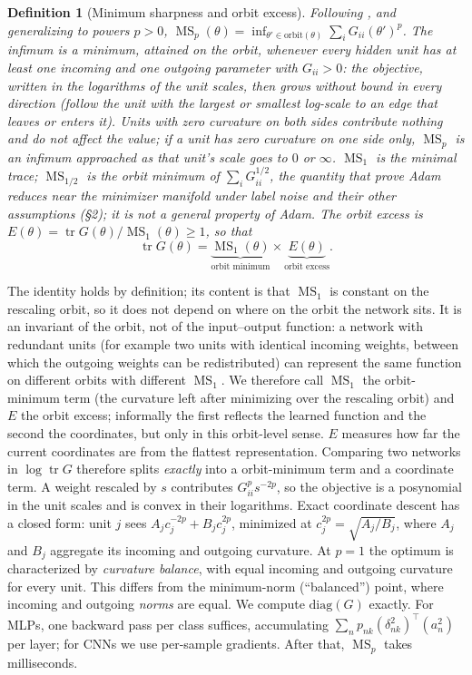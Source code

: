 \documentclass[10pt]{article}
\newtheorem{definition}{Definition}
\theoremstyle{remark}
\newcommand{\tr}{\operatorname{tr}}
\newcommand{\MS}{\operatorname{MS}}
\begin{document}
\begin{definition}[Minimum sharpness and orbit excess]
Following \citet{ibayashi2021minimum}, and generalizing to powers $p>0$,
$\MS_p(\theta)=\inf_{\theta'\in\mathrm{orbit}(\theta)}\sum_iG_{ii}(\theta')^{p}$.
The infimum is a minimum, attained on the orbit, whenever every hidden unit has at least one incoming and one outgoing parameter with $G_{ii}>0$: the objective, written in the logarithms of the unit scales, then grows without bound in every direction (follow the unit with the largest or smallest log-scale to an edge that leaves or enters it). Units with zero curvature on both sides contribute nothing and do not affect the value; if a unit has zero curvature on one side only, $\MS_p$ is an infimum approached as that unit's scale goes to $0$ or $\infty$. $\MS_1$ is the minimal trace; $\MS_{1/2}$ is the orbit minimum of $\sum_i G_{ii}^{1/2}$, the quantity that \citet{li2025adam} prove Adam reduces near the minimizer manifold under label noise and their other assumptions (\S2); it is not a general property of Adam. The \emph{orbit excess} is $E(\theta)=\tr G(\theta)/\MS_1(\theta)\ge1$, so that
\begin{equation}\label{eq:factor}
\tr G(\theta)=\underbrace{\MS_1(\theta)}_{\text{orbit minimum}}\times\underbrace{E(\theta)}_{\text{orbit excess}}.
\end{equation}
\end{definition}

The identity holds by definition; its content is that $\MS_1$ is constant on the rescaling orbit, so it does not depend on where on the orbit the network sits. It is an invariant of the orbit, not of the input--output function: a network with redundant units (for example two units with identical incoming weights, between which the outgoing weights can be redistributed) can represent the same function on different orbits with different $\MS_1$. We therefore call $\MS_1$ the orbit-minimum term (the curvature left after minimizing over the rescaling orbit) and $E$ the orbit excess; informally the first reflects the learned function and the second the coordinates, but only in this orbit-level sense. $E$ measures how far the current coordinates are from the flattest representation. Comparing two networks in $\log\tr G$ therefore splits \emph{exactly} into a orbit-minimum term and a coordinate term. A weight rescaled by $s$ contributes $G_{ii}^p s^{-2p}$, so the objective is a posynomial in the unit scales and is convex in their logarithms. Exact coordinate descent has a closed form: unit $j$ sees $A_jc_j^{-2p}+B_jc_j^{2p}$, minimized at $c_j^{2p}=\sqrt{A_j/B_j}$, where $A_j$ and $B_j$ aggregate its incoming and outgoing curvature. At $p=1$ the optimum is characterized by \emph{curvature balance}, with equal incoming and outgoing curvature for every unit. This differs from the minimum-norm (``balanced'') point, where incoming and outgoing \emph{norms} are equal. We compute $\mathrm{diag}(G)$ exactly. For MLPs, one backward pass per class suffices, accumulating $\sum_n p_{nk}(\delta_{nk}^2)^\top(a_n^2)$ per layer; for CNNs we use per-sample gradients. After that, $\MS_p$ takes milliseconds.
\end{document}

